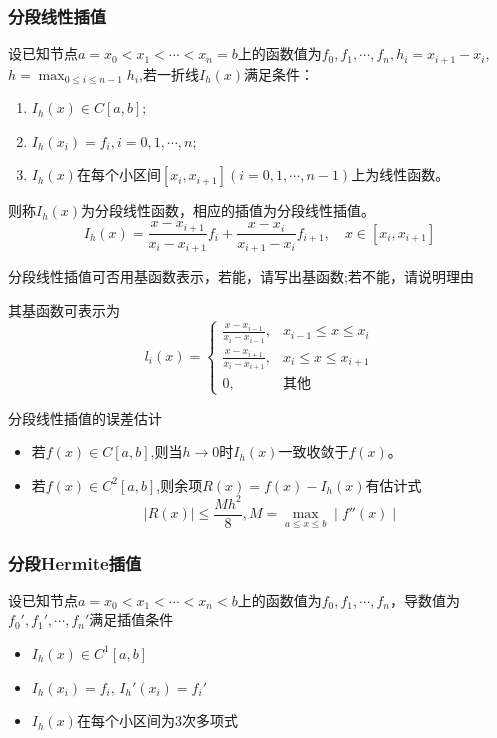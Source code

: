 \subsubsection{分段线性插值}
设已知节点$a=x_0<x_1<\cdots<x_n=b$上的函数值为$f_0,f_{1}, \cdots , f_{n}, h_{i}= x_{i+ 1}- x_{i}$, $h= \max _{0\leq i\leq n- 1}h_{i}$,若一折线$I_h(x)$满足条件：
\begin{enumerate}
    \item $I_{h}(x)\in C[a,b];$
    \item $I_{h}(x_{i})=f_{i},i=0,1,\cdots,n;$
    \item $I_{h}(x)$在每个小区间$[x_i,x_{i+1}](i=0,1,\cdots,n-1)$上为线性函数。
\end{enumerate}
则称$I_h(x)$为分段线性函数，相应的插值为分段线性插值。
\[
    I_h(x)=\frac{x-x_{i+1}}{x_i-x_{i+1}}f_i+\frac{x-x_i}{x_{i+1}-x_i}f_{i+1},\quad x\in[x_i,x_{i+1}]
\]
\begin{example}
    分段线性插值可否用基函数表示，若能，请写出基函数;若不能，请说明理由
    \begin{solution}
        其基函数可表示为
        \[
            l_{i}(x) = \left\{
                \begin{aligned}
                    \frac{x-x_{i-1}}{x_{i}-x_{i-1}}, & x_{i-1}\leq x \leq x_{i}\\
                    \frac{x-x_{i+1}}{x_{i}-x_{i+1}}, & x_{i}\leq x \leq x_{i+1}\\
                    0, & \text{其他}
                \end{aligned}
            \right.
        \]
    \end{solution}
\end{example}
\begin{note}
    分段线性插值的误差估计
    \begin{itemize}
        \item 若$f(x)\in C[a,b]$,则当$h\to0$时$I_h(x)$一致收敛于$f(x)$。
        \item 若$f(x)\in C^{2}[a,b]$,则余项$R(x)=f(x)-I_{h}(x)$有估计式
        \[
            \mid R(x)\mid\leq\frac{Mh^2}{8},M=\max_{a\leq x\leq b}\mid f''(x)\mid 
        \]
    \end{itemize}
\end{note}
\subsubsection{分段Hermite插值}
\begin{definition}[分段Hermite插值]
    设已知节点$a = x_0<x_1<\cdots <x_n<b$上的函数值为$f_0,f_1,\cdots,f_n$，导数值为$f_0',f_1',\cdots,f_n'$满足插值条件
    \begin{itemize}
        \item $I_{h}(x)\in C^1\left[ a,b \right]$
        \item $I_{h}(x_i) = f_i,\,I_{h}'(x_i) =f_{i}'$
        \item $I_{h}(x)$在每个小区间为3次多项式
    \end{itemize}
\end{definition}

